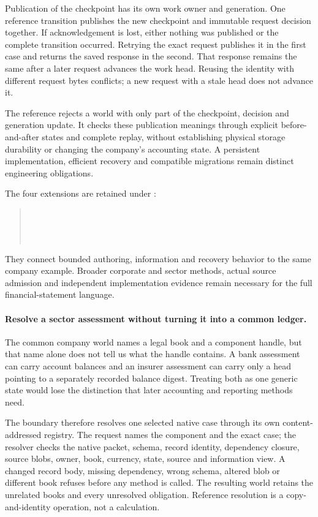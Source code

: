 Publication of the checkpoint has its own work owner and generation. One
reference transition publishes the new checkpoint and immutable request
decision together. If acknowledgement is lost, either nothing was published
or the complete transition occurred. Retrying the exact request publishes it
in the first case and returns the saved response in the second. That response
remains the same after a later request advances the work head. Reusing the
identity with different request bytes conflicts; a new request with a stale
head does not advance it.

The reference rejects a world with only part of the checkpoint, decision and
generation update. It checks these publication meanings through explicit
before-and-after states and complete replay, without establishing physical
storage durability or changing the company's accounting state. A persistent
implementation, efficient recovery and compatible migrations remain distinct
engineering obligations.

The four extensions are retained under :
\begin{quote}\small
{}\\
\\
\\
\end{quote}
They connect bounded authoring, information and recovery behavior to the same
company example. Broader corporate and
sector methods, actual source admission and independent implementation
evidence remain necessary for the full financial-statement language.

\paragraph{Resolve a sector assessment without turning it into a common ledger.}
The common company world names a legal book and a component handle, but that
name alone does not tell us what the handle contains. A bank assessment can
carry account balances and an insurer assessment can carry only a head pointing
to a separately recorded balance digest. Treating both as one generic state
would lose the distinction that later accounting and reporting methods need.

The boundary therefore resolves one selected native case through its own
content-addressed registry. The request names the component and the exact case;
the resolver checks the native packet, schema, record identity, dependency
closure, source blobs, owner, book, currency, state, source and information
view. A changed record body, missing dependency, wrong schema, altered blob or
different book refuses before any method is called. The resulting world retains
the unrelated books and every unresolved obligation. Reference resolution is a
copy-and-identity operation, not a calculation.

